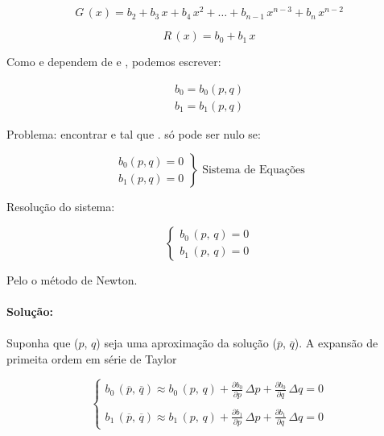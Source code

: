 \begin{equation}
 \label{cap1:sec7:eq3}
 G\,(x) = b_2 + b_3\,x + b_4\,x^2 + \ldots + b_{n-1}\,x^{n-3} + b_n\,x^{n-2}
\end{equation}

\begin{equation}
 \label{cap1:sec7:eq4}
 R\,(x) = b_0 + b_1\,x
\end{equation}

Como  e  dependem de  e , podemos escrever:

\begin{equation}
 \label{cap1:sec7:eq5}
 \begin{array}{l}
  b_{0} = b_{0}(p,q) \\
  b_{1} = b_{1}(p,q)
 \end{array}
\end{equation}

Problema: encontrar  e  tal que .  só pode ser nulo se:

\[
 \left.
 \begin{array}{l}
  b_{0}(p,q) = 0 \\
  b_{1}(p,q) = 0
 \end{array}
 \right\}
 \mbox{ Sistema de Equações}
\]

Resolução do sistema:

\[
 \left\{
 \begin{array}{l}
  b_{0} \, (p,\,q) = 0 \\
  b_{1} \, (p,\,q) = 0
 \end{array}
 \right.
\]

Pelo o método de Newton.
\\\\
\textbf{Solução:}
\\\\
Suponha que ($p$, $q$) seja uma aproximação da solução ($\overline{p}$, $\overline{q}$). A expansão de primeita ordem em série de Taylor

\[
 \left\{
 \begin{array}{l}
  b_0\,(\overline{p},\,\overline{q}) \approx b_0 \, (p,\,q) + \displaystyle \frac{\partial b_0}{\partial p} \, \Delta p + \frac{\partial b_0}{\partial q} \, \Delta q = 0 \\
  \\
  b_1\,(\overline{p},\,\overline{q}) \approx b_1 \, (p,\,q) + \displaystyle \frac{\partial b_1}{\partial p} \, \Delta p + \frac{\partial b_1}{\partial q} \, \Delta q = 0
 \end{array}
 \right.
\]

